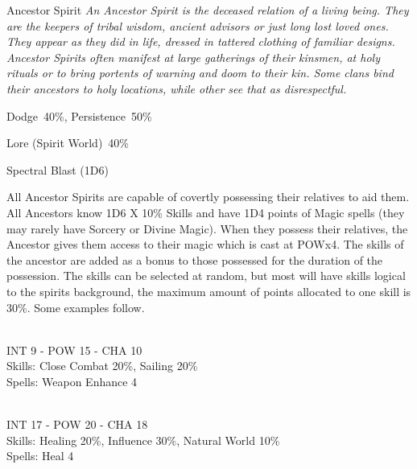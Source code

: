 \begin{monsterbox}{Ancestor Spirit}
	\textit{An Ancestor Spirit is the deceased relation of a living being. They are the keepers of tribal wisdom, ancient advisors or just long lost loved ones. They appear as they did in life, dressed in tattered clothing of familiar designs. Ancestor Spirits often manifest at large gatherings of their kinsmen, at holy rituals or to bring portents of warning and doom to their kin. Some clans bind their ancestors to holy locations, while other see that as disrespectful.}\\
	\rpghline
	\basics[%
	powerpoints = 17,
	movementrate = 30m,
	plunderrating = 0
	]
	\rpghline%
	\stats[ %
		STR = -,
		CON = -,
		DEX = -,
		SIZ = -,
		INT = 3D6    (11),
		POW = 3D6+6  (17),
		CHA = 3D6    (11)
	]
	\rpghline%
	\begin{rpg-monsteraction}[Resistances]
		Dodge~40\%, Persistence~50\%
	\end{rpg-monsteraction}
	\begin{rpg-monsteraction}[Knowledge]
		Lore (Spirit World)~40\%
	\end{rpg-monsteraction}
	\begin{rpg-monsteraction}
		Spectral Blast (1D6)
	\end{rpg-monsteraction}
	\begin{rpg-monsteraction}
		All Ancestor Spirits are capable of covertly possessing their relatives to aid them. All Ancestors know 1D6 X 10\% Skills and have 1D4 points of Magic spells (they may rarely have Sorcery or Divine Magic). When they possess their relatives, the Ancestor gives them access to their magic which is cast at POWx4. The skills of the ancestor are added as a bonus to those possessed for the duration of the possession. The skills can be selected at random, but most will have skills logical to the spirits background, the maximum amount of points allocated to one skill is 30\%. Some examples follow.
	\end{rpg-monsteraction}
	\begin{rpg-monsteraction}
		\\INT 9 - POW 15 - CHA 10\\
		Skills: Close Combat 20\%, Sailing 20\%\\
                Spells: Weapon Enhance 4
	\end{rpg-monsteraction}

	\begin{rpg-monsteraction}
		\\INT 17 - POW 20 - CHA 18\\
		Skills: Healing 20\%, Influence 30\%, Natural World 10\%\\
                Spells: Heal 4
	\end{rpg-monsteraction}
\end{monsterbox}

